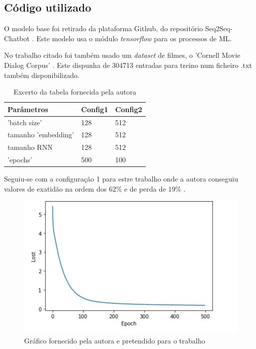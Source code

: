 \documentclass{article}
\begin{document}
\subsection{Código utilizado}
O modelo base foi retirado da plataforma Github, do repositório Seq2Seq-Chatbot \cite{abonia2020seq2seq}. Este modelo usa o módulo \textit{tensorflow} para os processos de ML.

No trabalho citado foi também usado um \textit{dataset} de filmes, o 'Cornell Movie Dialog Corpus' \cite{cornell}. Este dispunha de 304713 entradas para treino num ficheiro .txt também disponibilizado.

\begin{table}[htb]
    \centering
    \begin{tabular}{l | l l}
        \hline
        Parâmetros  & Config1 & Config2 \\
        \hline
        'batch size' &  128  &  512 \\
        tamanho 'embedding' &  128     &  512  \\
        tamanho RNN  & 128     &  512 \\
        'epochs' &  500  &  100 \\
    \end{tabular}
    \caption{Excerto da tabela fornecida pela autora}
    \cite{sojasingarayar2020seq2seq}
    \label{tabmodel}
\end{table}

Seguiu-se com a configuração 1 para estre trabalho onde a autora conseguiu valores de exatidão na ordem dos $62\%$ e de perda de $19\%$ \cite{sojasingarayar2020seq2seq}.

\begin{figure}[htb]
    \centering
    \includegraphics[scale=0.8]{abonialoss}
    \caption{Gráfico fornecido pela autora e pretendido para o trabalho}
    \label{abonialoss}
\end{figure}
\end{document}
